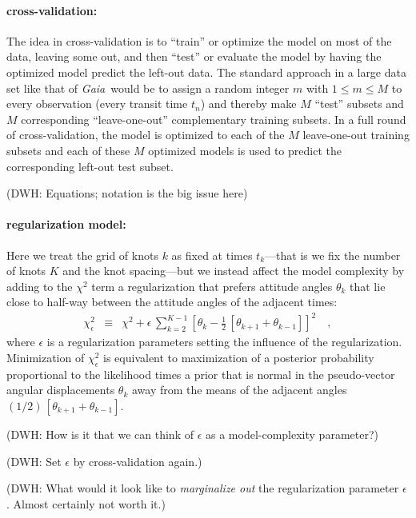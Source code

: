 \documentclass[12pt]{article}
\newcommand{\project}[1]{\textsl{#1}}
\newcommand{\gaia}{\project{Gaia}}
\begin{document}
\paragraph{cross-validation:}
The idea in cross-validation is to ``train'' or optimize the model on
most of the data, leaving some out, and then ``test'' or evaluate the
model by having the optimized model predict the left-out data.  The
standard approach in a large data set like that of \gaia\ would be to
assign a random integer $m$ with $1\leq m\leq M$ to every observation
(every transit time $t_n$) and thereby make $M$ ``test'' subsets and
$M$ corresponding ``leave-one-out'' complementary training subsets.
In a full round of cross-validation, the model is optimized to each of
the $M$ leave-one-out training subsets and each of these $M$ optimized
models is used to predict the corresponding left-out test subset.

(DWH: Equations; notation is the big issue here)

\paragraph{regularization model:}
Here we treat the grid of knots $k$ as fixed at times $t_k$---that is
we fix the number of knots $K$ and the knot spacing---but we instead
affect the model complexity by adding to the $\chi^2$ term a
regularization that prefers attitude angles $\theta_k$ that lie close
to half-way between the attitude angles of the adjacent times:
\begin{eqnarray}\displaystyle
\chi^2_\epsilon &\equiv& \chi^2 + \epsilon\,\sum_{k=2}^{K-1} \left[\theta_k - \frac{1}{2}\,[\theta_{k+1} + \theta_{k-1}]\right]^2
\quad ,
\end{eqnarray}
where $\epsilon$ is a regularization parameters setting the influence
of the regularization.  Minimization of $\chi^2_\epsilon$ is
equivalent to maximization of a posterior probability proportional to
the likelihood times a prior that is normal in the pseudo-vector
angular displacements $\theta_k$ away from the means of the adjacent
angles $(1/2)\,[\theta_{k+1}+\theta_{k-1}]$.

(DWH: How is it that we can think of $\epsilon$ as a model-complexity
parameter?)

(DWH: Set $\epsilon$ by cross-validation again.)

(DWH: What would it look like to \emph{marginalize out} the
regularization parameter $\epsilon$.  Almost certainly not worth it.)
\end{document}
